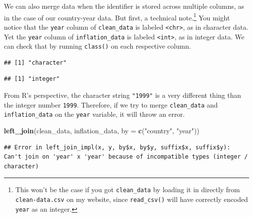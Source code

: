 \documentclass[12pt,oneside,openany]{book}
\newenvironment{Shaded}{\begin{snugshade}}{\end{snugshade}}
\newcommand{\KeywordTok}[1]{\textcolor[rgb]{0.13,0.29,0.53}{\textbf{#1}}}
\newcommand{\DataTypeTok}[1]{\textcolor[rgb]{0.13,0.29,0.53}{#1}}
\newcommand{\StringTok}[1]{\textcolor[rgb]{0.31,0.60,0.02}{#1}}
\newcommand{\OperatorTok}[1]{\textcolor[rgb]{0.81,0.36,0.00}{\textbf{#1}}}
\newcommand{\NormalTok}[1]{#1}
\let\rmarkdownfootnote\footnote%
\def\footnote{\protect\rmarkdownfootnote}
\begin{document}
We can also merge data when the identifier is stored across multiple
columns, as in the case of our country-year data. But first, a technical
note.\footnote{This won't be the case if you got \texttt{clean\_data} by
  loading it in directly from \texttt{clean-data.csv} on my website,
  since \texttt{read\_csv()} will have correctly encoded \texttt{year}
  as an integer.} You might notice that the \texttt{year} column of
\texttt{clean\_data} is labeled \texttt{\textless{}chr\textgreater{}},
as in character data. Yet the \texttt{year} column of
\texttt{inflation\_data} is labeled
\texttt{\textless{}int\textgreater{}}, as in integer data. We can check
that by running \texttt{class()} on each respective column.

\begin{Shaded}
\end{Shaded}

\begin{verbatim}
## [1] "character"
\end{verbatim}

\begin{Shaded}
\end{Shaded}

\begin{verbatim}
## [1] "integer"
\end{verbatim}

From R's perspective, the character string \texttt{"1999"} is a very
different thing than the integer number \texttt{1999}. Therefore, if we
try to merge \texttt{clean\_data} and \texttt{inflation\_data} on the
\texttt{year} variable, it will throw an error.

\begin{Shaded}
\begin{Highlighting}[]
\KeywordTok{left_join}\NormalTok{(clean_data,}
\NormalTok{          inflation_data,}
          \DataTypeTok{by =} \KeywordTok{c}\NormalTok{(}\StringTok{"country"}\NormalTok{, }\StringTok{"year"}\NormalTok{))}
\end{Highlighting}
\end{Shaded}

\begin{verbatim}
## Error in left_join_impl(x, y, by$x, by$y, suffix$x, suffix$y): Can't join on 'year' x 'year' because of incompatible types (integer / character)
\end{verbatim}
\end{document}
